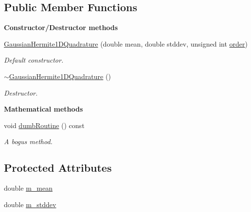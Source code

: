 \subsection*{Public Member Functions}
\begin{Indent}{\bf Constructor/\-Destructor methods}\par
\begin{DoxyCompactItemize}
\item 
\hyperlink{class_q_u_e_s_o_1_1_gaussian_hermite1_d_quadrature_a93622cfcdf05cb9a7961c76b4d749b55}{Gaussian\-Hermite1\-D\-Quadrature} (double mean, double stddev, unsigned int \hyperlink{class_q_u_e_s_o_1_1_base1_d_quadrature_a07713b5e8df24bbc8e3e9d13b707e5d0}{order})
\begin{DoxyCompactList}\small\item\em Default constructor. \end{DoxyCompactList}\item 
\hyperlink{class_q_u_e_s_o_1_1_gaussian_hermite1_d_quadrature_af8139b48716bd162dab8050e4b693784}{$\sim$\-Gaussian\-Hermite1\-D\-Quadrature} ()
\begin{DoxyCompactList}\small\item\em Destructor. \end{DoxyCompactList}\end{DoxyCompactItemize}
\end{Indent}
\begin{Indent}{\bf Mathematical methods}\par
\begin{DoxyCompactItemize}
\item 
void \hyperlink{class_q_u_e_s_o_1_1_gaussian_hermite1_d_quadrature_ae622aec1b3ed4d5b1630825819322090}{dumb\-Routine} () const 
\begin{DoxyCompactList}\small\item\em A bogus method. \end{DoxyCompactList}\end{DoxyCompactItemize}
\end{Indent}
\subsection*{Protected Attributes}
\begin{DoxyCompactItemize}
\item 
double \hyperlink{class_q_u_e_s_o_1_1_gaussian_hermite1_d_quadrature_a75f2f70f516506c0c93c64f1074cbe8f}{m\-\_\-mean}
\item 
double \hyperlink{class_q_u_e_s_o_1_1_gaussian_hermite1_d_quadrature_ad3114fcc967725e7cabcbba4b09a8bb7}{m\-\_\-stddev}
\end{DoxyCompactItemize}


